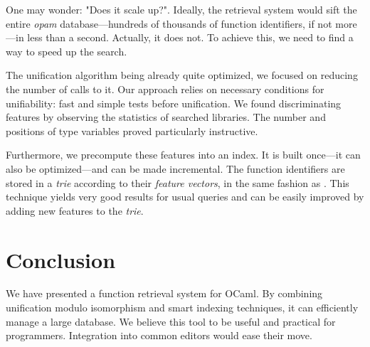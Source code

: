 \documentclass [a4paper,11pt] {scrartcl}
\begin{document}
One may wonder: "Does it scale up?". Ideally, the retrieval system would sift the entire \textit {opam} database—hundreds of thousands of function identifiers, if not more—in less than a second. Actually, it does not. To achieve this, we need to find a way to speed up the search.

The unification algorithm being already quite optimized, we focused on reducing the number of calls to it. Our approach relies on necessary conditions for unifiability: fast and simple tests before unification. We found discriminating features by observing the statistics of searched libraries. The number and positions of type variables proved particularly instructive.

Furthermore, we precompute these features into an index. It is built once—it can also be optimized—and can be made incremental. The function identifiers are stored in a \textit {trie} according to their \textit {feature vectors}, in the same fashion as \cite {schulz}. This technique yields very good results for usual queries and can be easily improved by adding new features to the \textit {trie}.


\section {Conclusion}

We have presented a function retrieval system for OCaml. By combining unification modulo isomorphism and smart indexing techniques, it can efficiently manage a large database. We believe this tool to be useful and practical for programmers. Integration into common editors would ease their move.


\printbibliography
\end{document}

